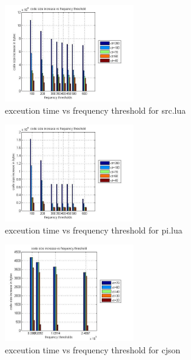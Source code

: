 \documentclass{sigplanconf}
\begin{document}
 \begin{figure}
	 \begin{center}
		 \includegraphics[width=0.5\textwidth]{codesizeincrease.jpg} 
	 \end{center}
	 \caption{exceution time vs frequency threshold for src.lua}
	 \label{src_cs}
 \end{figure}
 
 \begin{figure}
	 \begin{center}
		 \includegraphics[width=0.5\textwidth]{pi_codesize.jpg} 
	 \end{center}
	 \caption{exceution time vs frequency threshold for pi.lua}
	 \label{pi_cs}
 \end{figure}
 
 \begin{figure}
	 \begin{center}
		 \includegraphics[width=0.5\textwidth]{cj_codesize.jpg} 
	 \end{center}
	 \caption{exceution time vs frequency threshold for cjson}
	 \label{cj_cs}
 \end{figure}
\end{document}
